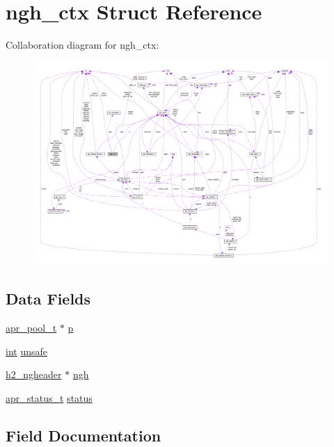 \hypertarget{structngh__ctx}{}\section{ngh\+\_\+ctx Struct Reference}
\label{structngh__ctx}


Collaboration diagram for ngh\+\_\+ctx\+:
\nopagebreak
\begin{figure}[H]
\begin{center}
\leavevmode
\includegraphics[width=350pt]{structngh__ctx__coll__graph}
\end{center}
\end{figure}
\subsection*{Data Fields}
\begin{DoxyCompactItemize}
\item 
\hyperlink{structapr__pool__t}{apr\+\_\+pool\+\_\+t} $\ast$ \hyperlink{structngh__ctx_a2e5a2a8843c2e6995f8fbbf0dad36635}{p}
\item 
\hyperlink{pcre_8txt_a42dfa4ff673c82d8efe7144098fbc198}{int} \hyperlink{structngh__ctx_aca05bc87c3cdbade4a186c449e8b33b0}{unsafe}
\item 
\hyperlink{structh2__ngheader}{h2\+\_\+ngheader} $\ast$ \hyperlink{structngh__ctx_a809b1fed74e8aa3f35a8c9441d86f7cb}{ngh}
\item 
\hyperlink{group__apr__errno_gaa5105fa83cc322f09382292db8b47593}{apr\+\_\+status\+\_\+t} \hyperlink{structngh__ctx_a1055063d6872439776f6f4224b0b2264}{status}
\end{DoxyCompactItemize}


\subsection{Field Documentation}
